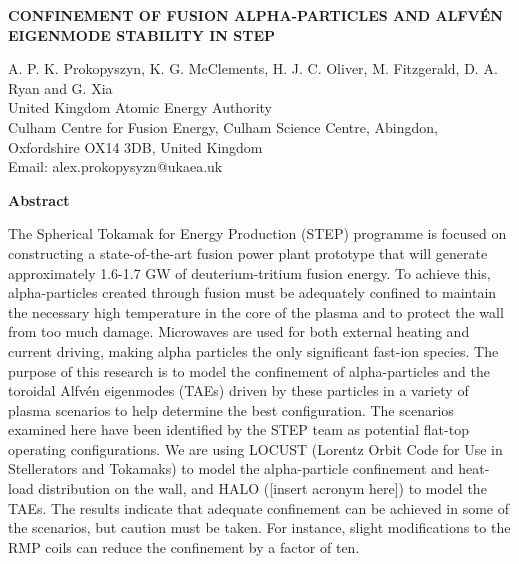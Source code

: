 \documentclass[10pt, a4paper, twoside]{article}
\begin{document}
\begin{flushleft}
\fontsize{12}{14}\selectfont \textbf{CONFINEMENT OF FUSION ALPHA-PARTICLES AND ALFV\'EN EIGENMODE STABILITY IN STEP}

\fontsize{10}{13}\selectfont

A. P. K. Prokopyszyn, K. G. McClements, 
H. J. C. Oliver, M. Fitzgerald, D. A. Ryan and G. Xia \\
United Kingdom Atomic Energy Authority \\
Culham Centre for Fusion Energy, Culham Science Centre, Abingdon, Oxfordshire OX14 3DB, United Kingdom \\
Email: alex.prokopysyzn@ukaea.uk

\end{flushleft}

\begin{flushleft}
\selectfont \textbf{Abstract}
\end{flushleft}

\setlength{\parindent}{1cm}
\fontsize{9}{12pt}\selectfont

The Spherical Tokamak for Energy Production (STEP) programme is focused on constructing a state-of-the-art fusion power plant prototype that will generate approximately 1.6-1.7 GW of deuterium-tritium fusion energy. To achieve this, alpha-particles created through fusion must be adequately confined to maintain the necessary high temperature in the core of the plasma and to protect the wall from too much damage. Microwaves are used for both external heating and current driving, making alpha particles the only significant fast-ion species. The purpose of this research is to model the confinement of alpha-particles and the toroidal Alfvén eigenmodes (TAEs) driven by these particles in a variety of plasma scenarios to help determine the best configuration. The scenarios examined here have been identified by the STEP team as potential flat-top operating configurations. We are using LOCUST (Lorentz Orbit Code for Use in Stellerators and Tokamaks) to model the alpha-particle confinement and heat-load distribution on the wall, and HALO ([insert acronym here]) to model the TAEs. The results indicate that adequate confinement can be achieved in some of the scenarios, but caution must be taken. For instance, slight modifications to the RMP coils can reduce the confinement by a factor of ten.

\setlength{\parindent}{0pt}
\fontsize{10}{13}\selectfont
\end{document}
